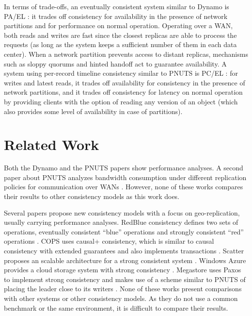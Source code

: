 \documentclass[man,floatsintext,12pt]{apa6}
\begin{document}
In terms of trade-offs, an eventually consistent system similar to Dynamo is
PA/EL \parencite{Abadi2012}: it trades off consistency for availability in the
presence of network partitions and for performance on normal operation.
Operating over a WAN, both reads and writes are fast since the closest replicas
are able to process the requests (as long as the system keeps a sufficient
number of them in each data center). When a network partition prevents access
to distant replicas, mechanisms such as sloppy quorums and hinted handoff act
to guarantee availability. A system using per-record timeline consistency
similar to PNUTS is PC/EL \parencite{Abadi2012}: for writes and latest reads,
it trades off availability for consistency in the presence of network
partitions, and it trades off consistency for latency on normal operation by
providing clients with the option of reading any version of an object (which
also provides some level of availability in case of partitions).

\section{Related Work}

Both the Dynamo \parencite{DeCandia2007} and the PNUTS papers
\parencite{Cooper2008} show performance analyses. A second paper about PNUTS
analyzes bandwidth consumption under different replication policies for
communication over WANs \parencite{Kadambi2011}. However, none of these works
compares their results to other consistency models as this work does.

Several papers propose new consistency models with a focus on geo-replication,
usually carrying performance analyses. RedBlue consistency defines two sets
of operations, eventually consistent ``blue'' operations and strongly consistent
``red'' operations \parencite{Li2012}. COPS uses causal+ consistency, which is similar
to causal consistency with extended guarantees and also implements transactions
\parencite{Lloyd2011}. Scatter proposes an scalable architecture for a strong
consistent system \parencite{Glendenning2011}. Windows Azure provides a cloud
storage system with strong consistency \parencite{Calder2011}. Megastore uses
Paxos to implement strong consistency and makes use of a scheme similar to
PNUTS of placing the leader close to its writers \parencite{Baker2011}. None of
these works present comparisons with other systems or other consistency models.
As they do not use a common benchmark or the same environment, it is difficult
to compare their results.
\end{document}
